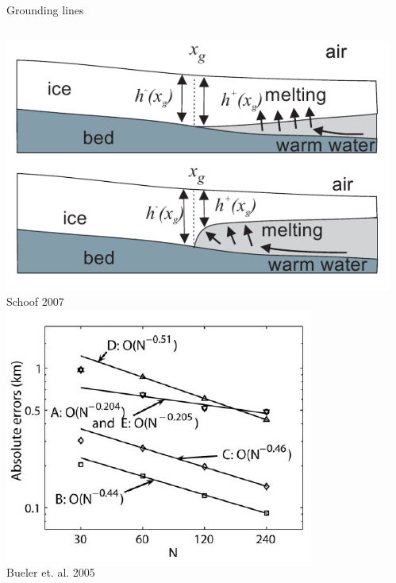 \begin{frame}{Grounding lines}
  \begin{columns}
    \begin{column}{0.45\textwidth}
      \centering
      \includegraphics[width=\textwidth]{figures/GroundingLine/circulation} \\
      \vspace{-.5em}
      {\tiny Schoof 2007} \\
      \includegraphics[width=\textwidth]{figures/GroundingLine/isothermal-Linfty} \\
      \vspace{-.5em}
      {\tiny Bueler et. al. 2005}
    \end{column}
    \begin{column}{0.55\textwidth}

\end{column}
\end{columns}
\end{frame}
